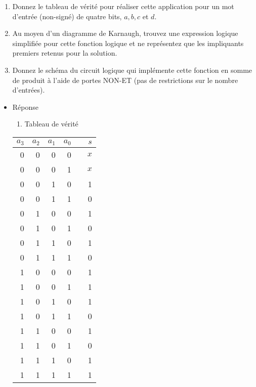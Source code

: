\documentclass[letter, oneside]{book}
\begin{document}
\begin{itemize}
\begin{enumerate}
\item Donnez le tableau de vérité pour réaliser cette application pour un
mot d'entrée (non-signé) de quatre bits, \(a, b, c\) et \(d\).

\item Au moyen d'un diagramme de Karnaugh, trouvez une expression logique
simplifiée pour cette fonction logique et ne représentez que les
impliquants premiers retenus pour la solution.

\item Donnez le schéma du circuit logique qui implémente cette fonction
en somme de produit à l'aide de portes NON-ET (pas de restrictions
sur le nombre d'entrées).
\end{enumerate}

\begin{itemize}
\item Réponse
\label{sec:org74ffc8c}
\begin{enumerate}
\item Tableau de vérité
\end{enumerate}
\begin{center}
\begin{tabular}{rrrrlr}
\(a_3\) & \(a_2\) & \(a_1\) & \(a_0\) &  & \(s\)\\[0pt]
\hline
0 & 0 & 0 & 0 &  & \(x\)\\[0pt]
0 & 0 & 0 & 1 &  & \(x\)\\[0pt]
0 & 0 & 1 & 0 &  & 1\\[0pt]
0 & 0 & 1 & 1 &  & 0\\[0pt]
0 & 1 & 0 & 0 &  & 1\\[0pt]
0 & 1 & 0 & 1 &  & 0\\[0pt]
0 & 1 & 1 & 0 &  & 1\\[0pt]
0 & 1 & 1 & 1 &  & 0\\[0pt]
1 & 0 & 0 & 0 &  & 1\\[0pt]
1 & 0 & 0 & 1 &  & 1\\[0pt]
1 & 0 & 1 & 0 &  & 1\\[0pt]
1 & 0 & 1 & 1 &  & 0\\[0pt]
1 & 1 & 0 & 0 &  & 1\\[0pt]
1 & 1 & 0 & 1 &  & 0\\[0pt]
1 & 1 & 1 & 0 &  & 1\\[0pt]
1 & 1 & 1 & 1 &  & 1\\[0pt]
\end{tabular}
\end{center}


\end{itemize}
\end{itemize}
\end{document}
